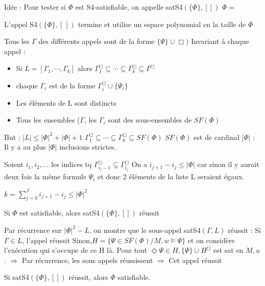 \documentclass[10pt,a4paper]{article}
\begin{document}
Idée : Pour tester si $\Phi$ est S4-satisfiable, on appelle satS4$(\{\Phi\}, [])$
$\Phi = $

\begin{thm}{}
 L'appel S4$(\{\Phi\}, [\,])$ termine et utilise un espace polynomial en la taille de $\Phi$
\end{thm}
\begin{dem}
 Tous les $\Gamma$ des différents appels sont de la forme $\{\Psi\} \cup \Box)$
Invariant à chaque appel : 
\begin{itemize}
 \item Si $L = [ \Gamma_1, \cdots, \Gamma_k]$ alors $\Gamma_1^{\Box} \subseteq \cdots \subseteq \Gamma_k^{\Box} \subseteq \Gamma^{\Box}$
 \item chaque $\Gamma_i$ est de la forme $\Gamma_i^{\Box} \cup \{\Psi_i\}$
 \item Les éléments de L sont distincts
 \item Tous les ensembles ($\Gamma$, les $\Gamma_i$ sont des sous-ensembles de $SF(\Phi)$
\end{itemize}

But : $|L| \leq |\Phi|^2 + |\Phi| +1$
$\Gamma_1^{\Box} \subseteq \cdots \subseteq \Gamma_k^{\Box} \subseteq  SF(\Phi)$
$SF(\Phi)$ est de cardinal $|\Phi|$ : Il y a au plus $|\Phi|$ inclusions strictes.

Soient $i_1, i_2, \dots$ les indices tq $\Gamma_{i_j-1}^{\Box} \varsubsetneq \Gamma_{i_j}^{\Box}$
On a $i_{j+1} - i_j \leq |\Phi|$ car sinon il y aurait deux fois la même formule $\Psi_i$ et donc 2 éléments de la liste L seraient égaux.

$k = \sum^J_{j=0} i_{j+1} - i_j \leq |\Phi|^2$
\end{dem}

\begin{thm}{}
 Si $\Phi$ est satisfiable, alors satS4$(\{\Phi\}, [])$ réussit
\end{thm}
\begin{dem}{}
 Par récurrence sur $|\Phi|^2 - L$, on montre que le sous-appel satS4$(\Gamma, L)$ réussit :
Si $\Gamma \in L$, l'appel réussit
Sinon,$H = \{\Psi \in SF(\Phi) / M, w \models \Psi \}$ et on considère l'exécution qui s'occupe de ce H là.
Pour tout $\Diamond \Psi \in H, \{ \Psi \} \cup H^{\Box}$ est sat en $M,u$.
$\Rightarrow$ Par récurrence, les sous appels réussissent $\Rightarrow$ Cet appel réussit
\end{dem}

\begin{thm}{}
 Si satS4$(\{\Phi\}, [])$ réussit, alors $\Phi$ satisfiable.
\end{thm}
\end{document}
